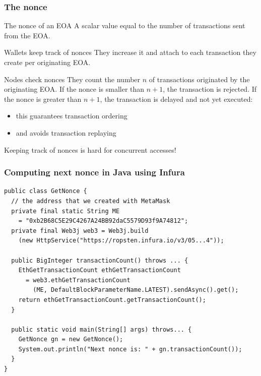 \documentclass[11pt]{beamer}  %
\begin{document}
\begin{frame}\frametitle{The nonce}

  \begin{greenbox}{The nonce of an EOA}
    A scalar value equal to the number of transactions sent from the EOA.
  \end{greenbox}

  \bigskip

  \begin{greenbox}{Wallets keep track of nonces}
    They increase it and attach to each transaction they create per
    originating EOA.
  \end{greenbox}

  \bigskip

  \begin{greenbox}{Nodes check nonces}
    They count the number $n$ of transactions originated
    by the originating EOA. If the nonce is smaller than $n+1$, the
    transaction is rejected. If the nonce is greater than $n+1$,
    the transaction is delayed and not yet executed:
    \begin{itemize}
    \item this guarantees transaction ordering
    \item and avoids transaction replaying
    \end{itemize}
  \end{greenbox}

  \bigskip

  \begin{redbox}{}
    Keeping track of nonces is hard for concurrent accesses!
  \end{redbox}

\end{frame}

\begin{frame}[fragile]\frametitle{Computing next nonce in Java using Infura}

{\scriptsize\begin{verbatim}
public class GetNonce {
  // the address that we created with MetaMask
  private final static String ME
    = "0xb2B68C5E29C4267A24BB92daC5579D93f9A74812";
  private final Web3j web3 = Web3j.build
    (new HttpService("https://ropsten.infura.io/v3/05...4"));

  public BigInteger transactionCount() throws ... {
    EthGetTransactionCount ethGetTransactionCount
      = web3.ethGetTransactionCount
        (ME, DefaultBlockParameterName.LATEST).sendAsync().get();
    return ethGetTransactionCount.getTransactionCount();
  }

  public static void main(String[] args) throws... {
    GetNonce gn = new GetNonce();
    System.out.println("Next nonce is: " + gn.transactionCount());
  }
}   
\end{verbatim}}

\end{frame}
\end{document}
